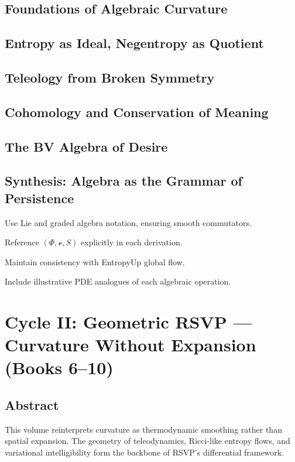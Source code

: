 \documentclass[12pt,oneside]{book}
\newcommand{\PhiField}{\ensuremath{\Phi}}
\newcommand{\vField}{\ensuremath{\boldsymbol{\mathcal{v}}}}
\newcommand{\SEntropy}{\ensuremath{S}}
\newcommand{\RSVPTriple}{\ensuremath{(\PhiField, \vField, \SEntropy)}}
\begin{document}
\chapter{Foundations of Algebraic Curvature}
\chapter{Entropy as Ideal, Negentropy as Quotient}
\chapter{Teleology from Broken Symmetry}
\chapter{Cohomology and Conservation of Meaning}
\chapter{The BV Algebra of Desire}
\chapter{Synthesis: Algebra as the Grammar of Persistence}

\begin{botinstructions}
  \item Use Lie and graded algebra notation, ensuring smooth commutators.
  \item Reference $\RSVPTriple$ explicitly in each derivation.
  \item Maintain consistency with EntropyUp global flow.
  \item Include illustrative PDE analogues of each algebraic operation.
\end{botinstructions}

\part{Cycle II: Geometric RSVP — Curvature Without Expansion (Books 6--10)}

\chapter*{Abstract}
This volume reinterprets curvature as thermodynamic smoothing rather than spatial expansion.
The geometry of teleodynamics, Ricci-like entropy flows, and variational intelligibility
form the backbone of RSVP’s differential framework.
\end{document}
